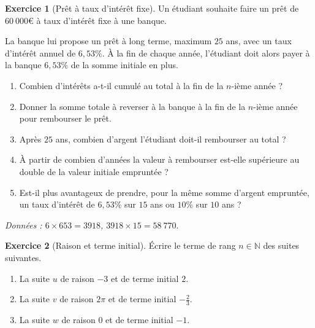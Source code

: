 \documentclass[12pt]{paper}
\theoremstyle{plain}
\theoremstyle{definition}
\newtheorem{ex}{Exercice}
\newcommand{\N}{\mathbb{N}}
\begin{document}
\pagestyle{fancy}
\fancyhead[R]{\today}


\begin{ex}[Prêt à taux d'intérêt fixe]
	Un étudiant souhaite faire un prêt de $60 \ 000$€ 	 à taux d'intérêt fixe à une banque.
	
	La banque lui propose un prêt à long terme, maximum $25$ ans, avec un taux d'intérêt annuel de $6{,}53 \%$.
	À la fin de chaque année, l'étudiant doit alors payer à la banque $6{,}53 \%$ de la somme initiale en plus.
	
	\begin{enumerate}
		\item Combien d'intérêts a-t-il cumulé au total à la fin de la $n$-ième année ?
		
		\item Donner la somme totale à reverser à la banque à la fin de la $n$-ième année pour rembourser le prêt.
		
		\item Après $25$ ans, combien d'argent l'étudiant doit-il rembourser au total ?
		
		\item À partir de combien d'années la valeur à rembourser est-elle supérieure au double de la valeur initiale empruntée ?
		
		\item Est-il plus avantageux de prendre, pour la même somme d'argent empruntée, un taux d'intérêt de $6{,}53\%$ sur $15$ ans ou $10\%$ sur $10$ ans ?
		
	\end{enumerate}
	
	\emph{Données : $6 \times 653 = 3918$, \qquad $3918 \times 15 = 58 \ 770.$}
\end{ex}


\begin{ex}[Raison et terme initial]

	Écrire le terme de rang $n \in \N$ des suites suivantes.
	
	\begin{enumerate}
		\item La suite $u$ de raison $-3$ et de terme initial $2$.
		\item La suite $v$ de raison $2\pi$ et de terme initial $-\frac23$.
		\item La suite $w$ de raison $0$ et de terme initial $-1$.
	\end{enumerate}
	
\end{ex}
\end{document}

